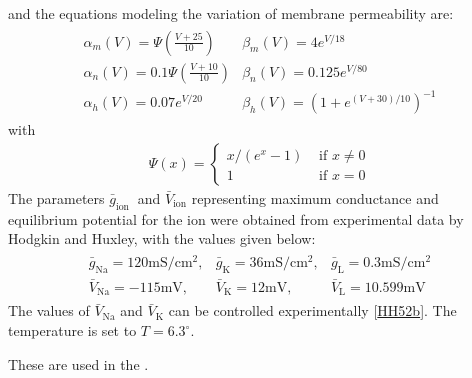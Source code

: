 \documentclass[letterpaper,10pt,english]{jupyterBook}
\begin{document}
\sphinxAtStartPar
and the equations modeling the variation of membrane permeability are:
\begin{equation*}
\begin{split}
\begin{array}{ll}
\alpha_{m}(V)=\Psi\left(\frac{V+25}{10}\right) & \beta_{m}(V)=4 e^{V / 18}
\\
\alpha_{n}(V)=0.1 \Psi\left(\frac{V+10}{10}\right) & \beta_{n}(V)=0.125
e^{V / 80} \\
\alpha_{h}(V)=0.07 e^{V / 20} & \beta_{h}(V)=\left(1+e^{(V+30) /
10}\right)^{-1}
\end{array}
\end{split}
\end{equation*}
\sphinxAtStartPar
with
\begin{equation*}
\begin{split}
\Psi(x)=\left\{\begin{array}{ll}
x /\left(e^{x}-1\right) & \text { if } x \neq 0 \\
1 & \text { if } x=0
\end{array}\right.
\end{split}
\end{equation*}
\sphinxAtStartPar
The parameters \(\bar{g}_{\text {ion }}\) and \(\bar{V}_{\text {ion}}\)
representing maximum conductance and equilibrium potential for the ion were
obtained from experimental data by Hodgkin and Huxley, with the values given
below:
\begin{equation*}
\begin{split}
\begin{array}{lll}
\bar{g}_{\mathrm{Na}}=120 \mathrm{mS} / \mathrm{cm}^{2}, &
\bar{g}_{\mathrm{K}}=36 \mathrm{mS} / \mathrm{cm}^{2}, &
\bar{g}_{\mathrm{L}}=0.3 \mathrm{mS} / \mathrm{cm}^{2} \\
\bar{V}_{\mathrm{Na}}=-115 \mathrm{mV}, & \bar{V}_{\mathrm{K}}=12
\mathrm{mV}, & \bar{V}_{\mathrm{L}}=10.599 \mathrm{mV}
\end{array}
\end{split}
\end{equation*}
\sphinxAtStartPar
The values of \(\bar{V}_{\mathrm{Na}}\) and \(\bar{V}_{\mathrm{K}}\) can be
controlled experimentally {[}\hyperlink{cite.references:id19}{HH52b}{]}.
The temperature is set to \(T=6.3^{\circ}\).

\sphinxAtStartPar
These are used in the {\hyperref[\detokenize{HodgkinHuxley::doc}]{}}.
\end{document}
